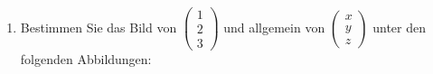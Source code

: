 \begin{LA}
\begin{enumerate}
\begin{enumerate}
    \item Punktspiegelung an \( (1, -2) \).

    \item Rotation (= Drehung) um \( 90^\circ \) im Gegenuhrzeigersinn um den Ursprung.

    \item Streckung um den Faktor \( k = 3 \) mit Zentrum im Ursprung.

    \item Spiegelung an der Geraden \( x = 3 \).
\end{enumerate}

\item Bestimmen Sie das Bild von \( \begin{pmatrix} 1 \\ 2 \\ 3 \end{pmatrix} \) und allgemein von \( \begin{pmatrix} x \\ y \\ z \end{pmatrix} \) unter den folgenden Abbildungen:


\end{enumerate}
\end{LA}
